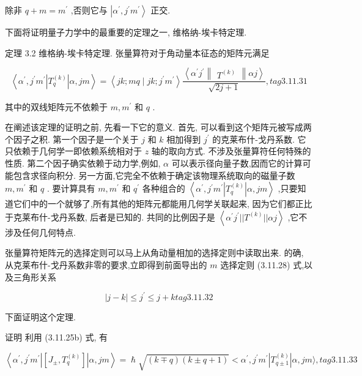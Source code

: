 除非 $q + m = {m}^{\prime }$ ,否则它与 $\left| {{\alpha }^{\prime },{j}^{\prime }{m}^{\prime }}\right\rangle$ 正交.

下面将证明量子力学中的最重要的定理之一, 维格纳-埃卡特定理.

定理 3.2 维格纳-埃卡特定理. 张量算符对于角动量本征态的矩阵元满足

$$
\left\langle {{\alpha }^{\prime },{j}^{\prime }{m}^{\prime }\left| {T}_{q}^{\left( k\right) }\right| \alpha ,{jm}}\right\rangle = \left\langle {{jk};{mq} \mid {jk};{j}^{\prime }{m}^{\prime }}\right\rangle \frac{\left\langle {\alpha }^{\prime }{j}^{\prime }\begin{Vmatrix}{T}^{\left( k\right) }\end{Vmatrix}\alpha j\right\rangle }{\sqrt{{2j} + 1}}, tag{3.11.31}
$$

其中的双线矩阵元不依赖于 $m,{m}^{\prime }$ 和 $q$ .

在阐述该定理的证明之前, 先看一下它的意义. 首先, 可以看到这个矩阵元被写成两个因子之积. 第一个因子是一个关于 $j$ 和 $k$ 相加得到 ${j}^{\prime }$ 的克莱布什-戈丹系数. 它只依赖于几何学一即依赖系统相对于 $z$ 轴的取向方式. 不涉及张量算符任何特殊的性质. 第二个因子确实依赖于动力学,例如, $\alpha$ 可以表示径向量子数,因而它的计算可能包含求径向积分. 另一方面,它完全不依赖于确定该物理系统取向的磁量子数 $m,{m}^{\prime }$ 和 $q$ . 要计算具有 $m,{m}^{\prime }$ 和 ${q}^{\prime }$ 各种组合的 $\left\langle {{\alpha }^{\prime },{j}^{\prime }{m}^{\prime }\left| {T}_{q}^{\left( k\right) }\right| \alpha ,{jm}}\right\rangle$ ,只要知道它们中的一个就够了,所有其他的矩阵元都能用几何学关联起来, 因为它们都正比于克莱布什-戈丹系数, 后者是已知的. 共同的比例因子是 $\left\langle {{\alpha }^{\prime }{j}^{\prime }\left| \right| {T}^{\left( k\right) }\left| \right| {\alpha j}}\right\rangle$ ,它不涉及任何几何特点.

张量算符矩阵元的选择定则可以马上从角动量相加的选择定则中读取出来. 的确, 从克莱布什-戈丹系数非零的要求,立即得到前面导出的 $m$ 选择定则 (3.11.28) 式,以及三角形关系

$$
\left| {j - k}\right| \leq {j}^{\prime } \leq j + k tag{3.11.32}
$$

下面证明这个定理.

证明 利用 (3.11.25b) 式, 有

$$
\left\langle {{\alpha }^{\prime },{j}^{\prime }{m}^{\prime }\left| \left\lbrack {{J}_{ \pm },{T}_{q}^{\left( k\right) }}\right\rbrack \right| \alpha ,{jm}}\right\rangle = \hslash \sqrt{\left( {k \mp q}\right) \left( {k \pm q + 1}\right) } < {\alpha }^{\prime },{j}^{\prime }{m}^{\prime }\left| {T}_{q \pm 1}^{\left( k\right) }\right| \alpha ,{jm}\rangle , tag{3.11.33}
$$

